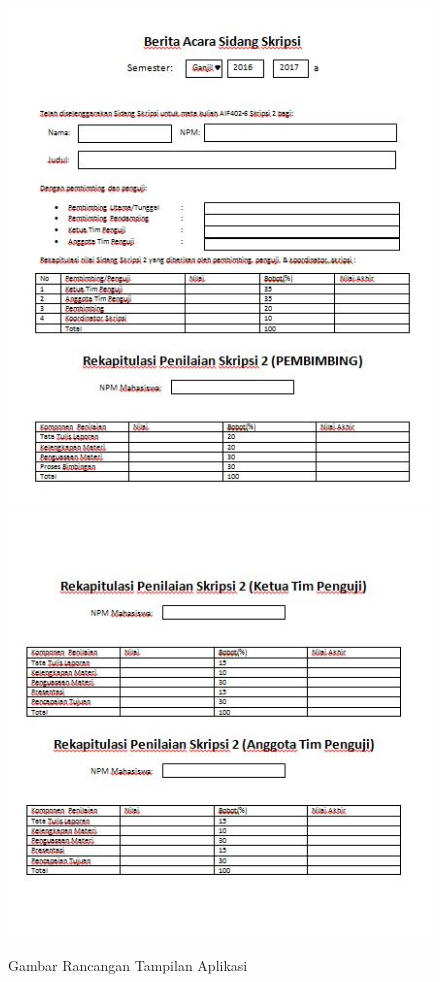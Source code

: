 \documentclass[a4paper,twoside]{article}
\begin{document}
\begin{enumerate}
			\begin{figure}[H]
				\centering
				\includegraphics[scale=0.75]{Gambar/tampilan1}
				\includegraphics[scale=0.75]{Gambar/tampilan2}
				\caption{Gambar Rancangan Tampilan Aplikasi}
				\label{fig:tampilan}
			\end{figure}
		

\end{enumerate}
\end{document}
